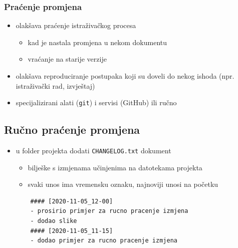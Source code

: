 \documentclass[aspectratio=169]{beamer}
\newenvironment{noheadline}{
    \setbeamertemplate{headline}{}
}{}
\begin{document}
\begin{noheadline}
    \begin{frame}
        \frametitle{Praćenje promjena}

        \begin{itemize}
            \setlength{\itemsep}{2em}

            \item olakšava praćenje istraživačkog procesa

            \begin{itemize}
                \item kad je nastala promjena u nekom dokumentu

                \item vraćanje na starije verzije

            \end{itemize}

            \pause

            \item olakšava reproduciranje postupaka koji su doveli do nekog
                ishoda (npr. istraživački rad, izvještaj)

            \pause

            \item specijalizirani alati (\texttt{git}) i servisi (GitHub) ili
                ručno

        \end{itemize}
    \end{frame}
\end{noheadline}

\subsection{Ručno praćenje promjena}

\begin{frame}[fragile]
    \begin{itemize}
        \setlength{\itemsep}{2em}

        \item u folder projekta dodati \texttt{CHANGELOG.txt} dokument

        \begin{itemize}
            \item bilješke s izmjenama učinjenima na datotekama projekta

            \item svaki unos ima vremensku oznaku, najnoviji unosi na početku

        \end{itemize}

        \pause

        \vspace*{3em}

        \begin{lstlisting}
    #### [2020-11-05_12-00]
    - prosirio primjer za rucno pracenje izmjena
    - dodao slike
    #### [2020-11-05_11-15]
    - dodao primjer za rucno pracenje izmjena
        \end{lstlisting}

    \end{itemize}
\end{frame}
\end{document}
